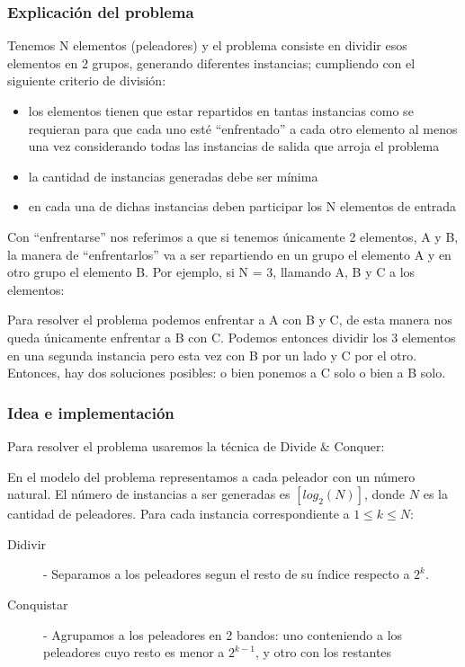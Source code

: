 \subsubsection{Explicación del problema}
\noindent Tenemos N elementos (peleadores) y el problema consiste en dividir esos elementos en 2 grupos, generando diferentes instancias; cumpliendo con el siguiente criterio de división:
\begin{itemize}
\item los elementos tienen que estar repartidos en tantas instancias como se requieran para que cada uno esté “enfrentado” a cada otro elemento al menos una vez considerando todas las instancias de salida que arroja el problema
\item la cantidad de instancias generadas debe ser mínima
\item en cada una de dichas instancias deben participar los N elementos de entrada
\end{itemize}
Con “enfrentarse” nos referimos a que si tenemos únicamente 2 elementos, A y B, la manera de “enfrentarlos” va a ser repartiendo en un grupo el elemento A y en otro grupo el elemento B.
Por ejemplo, si N = 3, llamando A, B y C a los elementos: 

Para resolver el problema podemos enfrentar a A con B y C, de esta manera nos queda únicamente enfrentar a B con C. Podemos entonces dividir los 3 elementos en una segunda instancia pero esta vez con B por un lado y C por el otro. Entonces, hay dos soluciones posibles: o bien ponemos a C solo o bien a B solo.

\subsubsection{Idea e implementación}
\noindent Para resolver el problema usaremos la técnica de Divide \& Conquer:

En el modelo del problema representamos a cada peleador con un número natural. El número de instancias a ser generadas es $[log_{2}(N)]$, donde $N$ es la cantidad de peleadores. Para cada instancia correspondiente a $1 \leq k \leq N$:
\begin{description}
\item[Didivir] - Separamos a los peleadores segun el resto de su índice respecto a $2^k$.
\item[Conquistar] - Agrupamos a los peleadores en 2 bandos: uno conteniendo a los peleadores cuyo resto es menor a $2^{k-1}$, y otro con los restantes
\end{description}

